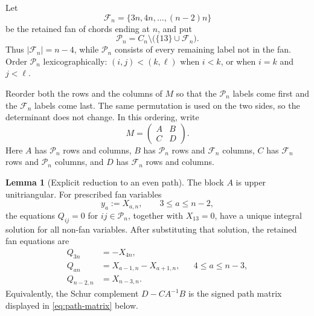 \documentclass[11pt]{article}
\theoremstyle{definition}
\newtheorem*{innerlemma}{Lemma}
\begin{document}
Let
\[
 \mathcal F_n=\{3n,4n,\ldots,(n-2)n\}
\]
be the retained fan of chords ending at $n$, and put
\[
 \mathcal P_n=C_n\setminus\bigl(\{13\}\cup\mathcal F_n\bigr).
\]
Thus $|\mathcal F_n|=n-4$, while $\mathcal P_n$ consists of every remaining
label not in the fan.  Order $\mathcal P_n$ lexicographically: $(i,j)<(k,\ell)$
when $i<k$, or when $i=k$ and $j<\ell$.

Reorder both the rows and the columns of $M$ so that the $\mathcal P_n$ labels
come first and the $\mathcal F_n$ labels come last.  The same permutation is
used on the two sides, so the determinant does not change.  In this ordering,
write
\begin{equation}\label{eq:block-M}
 M=\begin{pmatrix}A&B\\ C&D\end{pmatrix}.
\end{equation}
Here $A$ has $\mathcal P_n$ rows and columns, $B$ has $\mathcal P_n$ rows and
$\mathcal F_n$ columns, $C$ has $\mathcal F_n$ rows and $\mathcal P_n$
columns, and $D$ has $\mathcal F_n$ rows and columns.

\begin{innerlemma}[Explicit reduction to an even path]
The block $A$ is upper unitriangular.  For prescribed fan variables
\[
 y_a:=X_{a,n},\qquad 3\leq a\leq n-2,
\]
the equations $Q_{ij}=0$ for $ij\in\mathcal P_n$, together with $X_{13}=0$,
have a unique integral solution for all non-fan variables.  After substituting
that solution, the retained fan equations are
\begin{align}
 Q_{3n}&=-X_{4n},\label{eq:path-first}\\
 Q_{an}&=X_{a-1,n}-X_{a+1,n},
       &&4\leq a\leq n-3,\label{eq:path-middle}\\
 Q_{n-2,n}&=X_{n-3,n}.
 \label{eq:path-last}
\end{align}
Equivalently, the Schur complement $D-CA^{-1}B$ is the signed path matrix
displayed in \eqref{eq:path-matrix} below.
\end{innerlemma}
\end{document}
